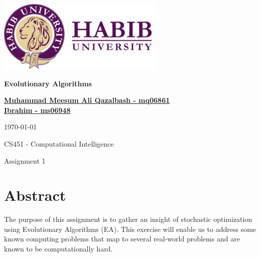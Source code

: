 \documentclass[12pt]{report} %
\begin{document}
% 

\begin{titlepage}
	\vspace*{\fill}

	\begin{center}

		\includegraphics[width=0.6\textwidth]{images/logo.png}

		\Huge
		\textbf{Evolutionary Algorithms}
		\vspace{0.5cm}

		\Large

		\textbf{ \href{mailto:mq06861@st.habib.edu.pk}{Muhammad Meesum Ali Qazalbash - mq06861}}\\
		\textbf{ \href{mailto:@st.habib.edu.pk}{{Ibrahim - ms06948}}}

		\today
		\vspace{0.5cm}

		CS451 - Computational Intelligence

		\vspace{0.5cm}
		\large
		Assignment 1
	\end{center}

	\vspace*{\fill}
\end{titlepage}

% 


\setcounter{page}{2} %

\chapter{Abstract} %
The purpose of this assignment is to gather an insight of stochastic optimization using Evolutionary Algorithms (EA). This exercise will enable us to address some known computing problems that map to several real-world problems and are known to be computationally hard.
\tableofcontents
\end{document}
